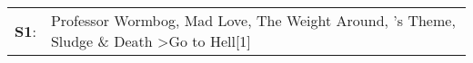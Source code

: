 \begin{supertabular}{p{0.03\textwidth}p{0.92\textwidth}}
 \textbf{S1}:  &  Professor Wormbog\textsuperscript{}, \enspace Mad Love\textsuperscript{}, \enspace The Weight Around\textsuperscript{}, 's Theme\textsuperscript{}, \enspace Sludge \& Death\textsuperscript{} \textgreater \enspace Go to Hell[1]\textsuperscript{}  \enspace  \\
\end{supertabular}
